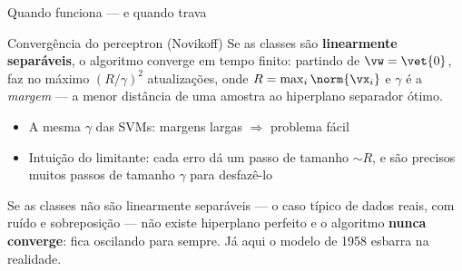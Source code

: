 \documentclass[aspectratio=169, 11pt]{beamer}
\begin{document}
\begin{frame}{Quando funciona — e quando trava}
  \begin{teobox}{Convergência do perceptron (Novikoff)}
    Se as classes são \textbf{linearmente separáveis}, o algoritmo converge em
    tempo finito: partindo de $\vw = \vet{0}$, faz no máximo
    $\left(R/\gamma\right)^{2}$ atualizações, onde
    $R = \max_i \norm{\vx_i}$ e $\gamma$ é a \emph{margem} — a menor distância
    de uma amostra ao hiperplano separador ótimo.
  \end{teobox}

  \begin{itemize}\setlength{\itemsep}{0.3ex}
    \item A mesma $\gamma$ das SVMs: margens largas $\Rightarrow$ problema fácil
    \item Intuição do limitante: cada erro dá um passo de tamanho $\sim\!R$,
          e são precisos muitos passos de tamanho $\gamma$ para desfazê-lo
  \end{itemize}

  \begin{alertabox}
    Se as classes \alert{não} são linearmente separáveis — o caso típico de
    dados reais, com ruído e sobreposição — não existe hiperplano perfeito e o
    algoritmo \textbf{nunca converge}: fica oscilando para sempre. Já aqui o
    modelo de 1958 esbarra na realidade.
  \end{alertabox}
\end{frame}
\end{document}
